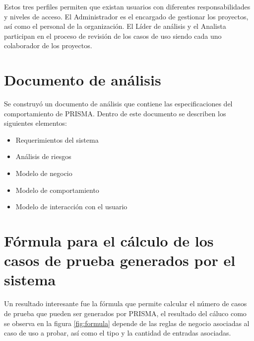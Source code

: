 Estos tres perfiles permiten que existan usuarios con diferentes responsabilidades y niveles de acceso. El Administrador es el encargado de gestionar los proyectos, así como el personal de la organización. El Líder
de análisis y el Analista participan en el proceso de revisión de los casos de uso siendo cada uno colaborador de los proyectos.\\

\section{Documento de análisis}
Se construyó un documento de análisis que contiene las especificaciones del comportamiento de PRISMA. Dentro de este documento se describen los siguientes elementos:

\begin{itemize}
 \item Requerimientos del sistema
 \item Análisis de riesgos
 \item Modelo de negocio
 \item Modelo de comportamiento
 \item Modelo de interacción con el usuario
\end{itemize}

\section{Fórmula para el cálculo de los casos de prueba generados por el sistema}
Un resultado interesante fue la fórmula que permite calcular el número de casos de prueba que pueden ser generados por PRISMA, el resultado del cáluco como se observa en la figura \ref{fig:formula} 
depende de las reglas de negocio asociadas al caso de uso a probar, así como el tipo y la cantidad de entradas asociadas.

